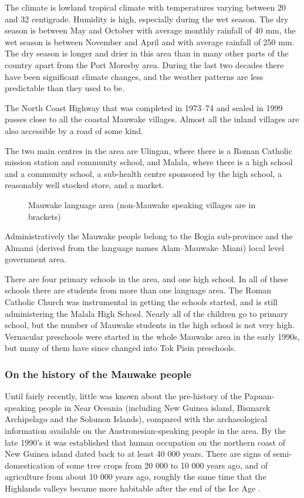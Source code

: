 The climate is lowland tropical climate with temperatures varying between 20{\textdegree} and 32{\textdegree} centigrade. Humidity is high, especially during the wet season.  The dry season is between May and October with average monthly rainfall of 40 mm, the wet season is between November and April and with average rainfall of 250 mm. The dry season is longer and drier in this area than in many other parts of the country apart from the Port Moresby area. During the last two decades there have been significant climate changes, and the weather patterns are less predictable than they used to be.

The North Coast Highway that was completed in 1973--74 and sealed in 1999 passes close to all the coastal Mauwake villages.  Almost all the inland villages are also accessible by a road of some kind. 

The two main centres in the area are Ulingan, where there is a Roman Catholic mission station and community school, and Malala, where there is a high school and a community school, a sub-health centre sponsored by the high school, a reasonably well stocked store, and a market.


\begin{figure}
\caption{Mauwake language area (non-Mauwake speaking villages are in brackets)}
\label{map:1:laguagearea}
\end{figure}

Administratively the Mauwake people belong to the Bogia sub-province and the Almami (derived from the language names Alam--Mauwake--Miani) local level government area. 

There are four primary schools in the area, and one high school.  In all of these schools there are students from more than one language area. The Roman Catholic Church was instrumental in getting the schools started, and is still administering the Malala High School.  Nearly all of the children go to primary school, but the number of Mauwake students in the high school is not very high. Vernacular preschools were started in the whole Mauwake area in the early 1990s, but many of them have since changed into Tok Pisin preschools.

\subsubsection{On the history of the Mauwake people}
Until fairly recently, little was known about the pre-history of the Papuan-speaking people in Near Oceania (including New Guinea island, Bismarck Archipelago and the Solomon Islands), compared with the archaeological information available on the Austronesian-speaking people in the area. By the late 1990's it was established that human occupation on the northern coast of New Guinea island dated back to at least 40 000 years. There are signs of semi-domestication of some tree crops from 20 000 to 10 000 years ago, and of agriculture from about 10 000 years ago, roughly the same time that the Highlands valleys became more habitable after the end of the Ice Age \citep[xi-xvii]{Pawley2005a}. 

